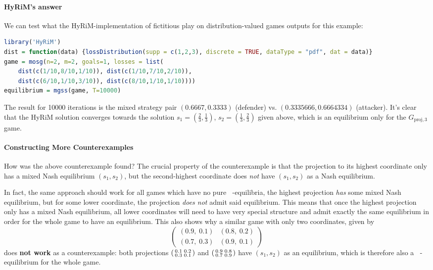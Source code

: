 \documentclass[a4paper]{scrreprt}
\DeclareMathOperator{\leqtail}{\leq_{\text{tail}}}
\begin{document}
    \paragraph{HyRiM's answer}
    We can test what the HyRiM-implementation of fictitious play on distribution-valued games outputs for this example:
    
\begin{lstlisting}[language=R]
library('HyRiM')
dist = function(data) {lossDistribution(supp = c(1,2,3), discrete = TRUE, dataType = "pdf", dat = data)}
game = mosg(n=2, m=2, goals=1, losses = list( 
    dist(c(1/10,8/10,1/10)), dist(c(1/10,7/10,2/10)), 
    dist(c(6/10,1/10,3/10)), dist(c(8/10,1/10,1/10))))
equilibrium = mgss(game, T=10000)
\end{lstlisting}

    The result for 10000 iterations is the mixed strategy pair $(0.6667, 0.3333)$ (defender) vs. $(0.3335666, 0.6664334)$ (attacker).
    It's clear that the HyRiM solution converges towards the solution $s_1 = (\frac{2}{3}, \frac{1}{3})$, $s_2 = (\frac{1}{3}, \frac{2}{3})$ given above, which is an equilibrium only for the $G_{\text{proj},3}$ game.
    
    \paragraph{Constructing More Counterexamples}
    How was the above counterexample found?
    The crucial property of the counterexample is that the projection to its highest coordinate only has a mixed Nash equilibrium $(s_1, s_2)$, but the second-highest coordinate does \emph{not} have $(s_1, s_2)$ as a Nash equilibrium.
    
    In fact, the same approach should work for all games which have no pure $\leqtail$-equilibria, the highest projection \emph{has} some mixed Nash equilibrium, but for some lower coordinate, the projection \emph{does not} admit said equilibrium. This means that once the highest projection only has a mixed Nash equilibrium, all lower coordinates will need to have very special structure and admit exactly the same equilibrium in order for the whole game to have an equilibrium. This also shows why a similar game with only two coordinates, given by
    \begin{equation}
        \begin{pmatrix}
            (0.9,\; 0.1) & (0.8,\; 0.2) \\
            (0.7,\; 0.3) & (0.9,\; 0.1)
        \end{pmatrix}
    \end{equation}
    does \textbf{not work} as a counterexample: both projections $\left(\begin{smallmatrix}0.1 & 0.2 \\ 0.3 & 0.1\end{smallmatrix}\right)$ and $\left(\begin{smallmatrix}0.9 & 0.8 \\ 0.7 & 0.9\end{smallmatrix}\right)$ have $(s_1, s_2)$ as an equilibrium, which is therefore also a $\leqtail$-equilibrium for the whole game.
    
\end{document}

